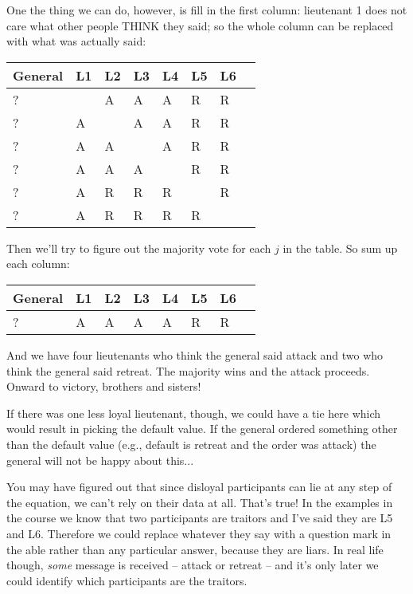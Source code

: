 One the thing we can do, however, is fill in the first column: lieutenant 1 does not care what other people THINK they said; so the whole column can be replaced with what was actually said:

\begin{center}
	\begin{tabular}{|l|l|l|l|l|l|l|l|}
		\hline
		General & L1 & L2 & L3 & L4 & L5 & L6 \\
		\hline
		?       & ~  & A  & A  & A  & R  & R  \\ \hline
		?       & A  & ~  & A  & A  & R  & R  \\ \hline
		?       & A  & A  & ~  & A  & R  & R  \\ \hline
		?       & A  & A  & A  & ~  & R  & R  \\ \hline
		?       & A  & R  & R  & R  & ~  & R  \\ \hline
		?       & A  & R  & R  & R  & R  & ~  \\ \hline
	\end{tabular}
\end{center}

Then we'll try to figure out the majority vote for each $j$ in the table. So sum up each column:

\begin{center}
	\begin{tabular}{|l|l|l|l|l|l|l|l|}
		\hline
		General & L1 & L2 & L3 & L4 & L5 & L6 \\
		\hline
		?       & A  & A  & A  & A  & R  & R  \\
		\hline
	\end{tabular}
\end{center}

And we have four lieutenants who think the general said attack and two who think the general said retreat. The majority wins and the attack proceeds. Onward to victory, brothers and sisters!

If there was one less loyal lieutenant, though, we could have a tie here which would result in picking the default value. If the general ordered something other than the default value (e.g., default is retreat and the order was attack) the general will not be happy about this...

You may have figured out that since disloyal participants can lie at any step of the equation, we can't rely on their data at all. That's true! In the examples in the course we know that two participants are traitors and I've said they are L5 and L6. Therefore we could replace whatever they say with a question mark in the able rather than any particular answer, because they are liars. In real life though, \textit{some} message is received -- attack or retreat -- and it's only later we could identify which participants are the traitors.

